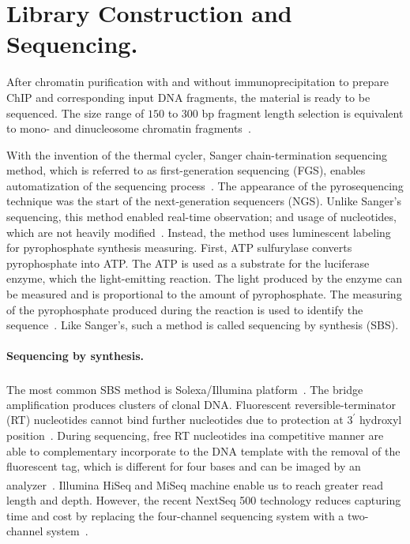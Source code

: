 











\section{Library Construction and Sequencing.}

After chromatin purification with and without immunoprecipitation to prepare ChIP and corresponding input DNA fragments, the material is ready to be sequenced. 
The size range of $150$ to $300$ bp fragment length selection is equivalent to mono- and dinucleosome chromatin fragments~\cite{kidder2011chip}.

With the invention of the thermal cycler,  Sanger chain-termination sequencing method, which is referred to as first-generation sequencing (FGS), enables automatization of the sequencing process~\cite{quail2012tale}. 
The appearance of the pyrosequencing technique was the start of the next-generation sequencers (NGS). 
Unlike Sanger's sequencing, this method enabled real-time observation; and usage of nucleotides, which are not heavily modified~\cite{ronaghi1996real, ronaghi1998sequencing}.
Instead, the method uses luminescent labeling for pyrophosphate synthesis measuring. 
First, ATP sulfurylase converts pyrophosphate into ATP. 
The ATP is used as a substrate for the luciferase enzyme, which the light-emitting reaction. 
The light produced by the enzyme can be measured and is proportional to the amount of pyrophosphate. 
The measuring of the pyrophosphate produced during the reaction is used to identify the sequence~\cite{hyman1988new}. 
Like Sanger's, such a method is called sequencing by synthesis (SBS).

\paragraph{Sequencing by synthesis.}
The most common SBS method is Solexa/Illumina\textsuperscript{\texttrademark} platform~\cite{voelkerding2009next}. 
The bridge amplification produces clusters of clonal DNA. 
Fluorescent reversible-terminator (RT) nucleotides cannot bind further nucleotides due to protection at $3^\prime$ hydroxyl position~\cite{heather2016sequence}. 
During sequencing, free RT nucleotides ina competitive manner are able to complementary incorporate to the DNA template with the removal of the fluorescent tag, which is different for four bases and can be imaged by an analyzer~\cite{berglund2011next}. 
Illumina\textsuperscript{\texttrademark} HiSeq and MiSeq machine enable us to reach greater read length and depth. 
However, the recent NextSeq 500 technology reduces capturing time and cost by replacing the four-channel sequencing system with a two-channel system~\cite{reuter2015high}. 



